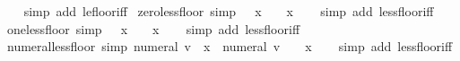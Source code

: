\begin{isabellebody}
%
\isadelimproof
\ \ %
\endisadelimproof
%
\isatagproof
{}\isamarkupfalse%
\ {\isacharparenleft}{\kern0pt}simp\ add{\isacharcolon}{\kern0pt}\ le{\isacharunderscore}{\kern0pt}floor{\isacharunderscore}{\kern0pt}iff{\isacharparenright}{\kern0pt}%
\endisatagproof
{\isafoldproof}%
%
\isadelimproof
\isanewline
%
\endisadelimproof
\isanewline
{}\isamarkupfalse%
\ zero{\isacharunderscore}{\kern0pt}less{\isacharunderscore}{\kern0pt}floor\ {\isacharbrackleft}{\kern0pt}simp{\isacharbrackright}{\kern0pt}{\isacharcolon}{\kern0pt}\ {\isachardoublequoteopen}{}\ {\isacharless}{\kern0pt}\ {\isasymlfloor}x{\isasymrfloor}\ {\isasymlongleftrightarrow}\ {}\ {\isasymle}\ x{\isachardoublequoteclose}\isanewline
%
\isadelimproof
\ \ %
\endisadelimproof
%
\isatagproof
{}\isamarkupfalse%
\ {\isacharparenleft}{\kern0pt}simp\ add{\isacharcolon}{\kern0pt}\ less{\isacharunderscore}{\kern0pt}floor{\isacharunderscore}{\kern0pt}iff{\isacharparenright}{\kern0pt}%
\endisatagproof
{\isafoldproof}%
%
\isadelimproof
\isanewline
%
\endisadelimproof
\isanewline
{}\isamarkupfalse%
\ one{\isacharunderscore}{\kern0pt}less{\isacharunderscore}{\kern0pt}floor\ {\isacharbrackleft}{\kern0pt}simp{\isacharbrackright}{\kern0pt}{\isacharcolon}{\kern0pt}\ {\isachardoublequoteopen}{}\ {\isacharless}{\kern0pt}\ {\isasymlfloor}x{\isasymrfloor}\ {\isasymlongleftrightarrow}\ {}\ {\isasymle}\ x{\isachardoublequoteclose}\isanewline
%
\isadelimproof
\ \ %
\endisadelimproof
%
\isatagproof
{}\isamarkupfalse%
\ {\isacharparenleft}{\kern0pt}simp\ add{\isacharcolon}{\kern0pt}\ less{\isacharunderscore}{\kern0pt}floor{\isacharunderscore}{\kern0pt}iff{\isacharparenright}{\kern0pt}%
\endisatagproof
{\isafoldproof}%
%
\isadelimproof
\isanewline
%
\endisadelimproof
\isanewline
{}\isamarkupfalse%
\ numeral{\isacharunderscore}{\kern0pt}less{\isacharunderscore}{\kern0pt}floor\ {\isacharbrackleft}{\kern0pt}simp{\isacharbrackright}{\kern0pt}{\isacharcolon}{\kern0pt}\ {\isachardoublequoteopen}numeral\ v\ {\isacharless}{\kern0pt}\ {\isasymlfloor}x{\isasymrfloor}\ {\isasymlongleftrightarrow}\ numeral\ v\ {\isacharplus}{\kern0pt}\ {}\ {\isasymle}\ x{\isachardoublequoteclose}\isanewline
%
\isadelimproof
\ \ %
\endisadelimproof
%
\isatagproof
{}\isamarkupfalse%
\ {\isacharparenleft}{\kern0pt}simp\ add{\isacharcolon}{\kern0pt}\ less{\isacharunderscore}{\kern0pt}floor{\isacharunderscore}{\kern0pt}iff{\isacharparenright}{\kern0pt}%
\endisatagproof
{\isafoldproof}%
%
\isadelimproof
\isanewline

\end{isabellebody}
